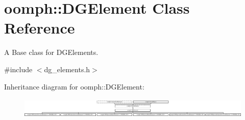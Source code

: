 \hypertarget{classoomph_1_1DGElement}{}\section{oomph\+:\+:D\+G\+Element Class Reference}
\label{classoomph_1_1DGElement}


A Base class for D\+G\+Elements.  




{\ttfamily \#include $<$dg\+\_\+elements.\+h$>$}

Inheritance diagram for oomph\+:\+:D\+G\+Element\+:\begin{figure}[H]
\begin{center}
\leavevmode
\includegraphics[height=0.998218cm]{classoomph_1_1DGElement}
\end{center}
\end{figure}
